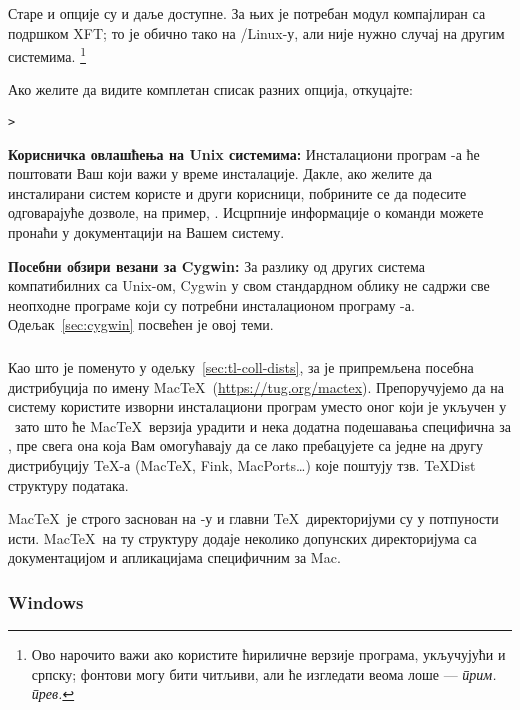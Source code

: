 \documentclass{article}
\begin{document}
Старе  и  опције су и даље доступне.
За њих је потребан модул  компајлиран са подршком 
XFT; то је обично тако на \GNU/Linux-у, али није нужно случај на
другим системима.%
\footnote{\textserbian{Ово нарочито важи ако користите
ћириличне верзије програма, укључујући и српску; фонтови могу бити
читљиви, али ће изгледати веома лоше --- \emph{прим. прев.}}} 

Ако желите да видите комплетан списак разних опција, откуцајте:
\begin{alltt}> 
\end{alltt}

\textbf{Корисничка овлашћења на Unix системима:}
Инсталациони програм \TL{}-а ће поштовати Ваш  који важи
у време инсталације. Дакле, ако желите да инсталирани систем користе
и други корисници, побрините се да подесите одговарајуће дозволе, на
пример, . Исцрпније информације о команди
 можете пронаћи у документацији на Вашем систему.

\textbf{Посебни обзири везани за Cygwin:} За разлику од других
система компатибилних са Unix-ом, Cygwin у свом стандардном облику не
садржи све неопходне програме који су потребни инсталационом програму
\TL{}-а. Одељак~\ref{sec:cygwin} посвећен је овој теми.


\subsubsection{\MacOSX}
\label{sec:macosx}

Као што је поменуто у одељку~\ref{sec:tl-coll-dists}, за \MacOSX је
припремљена посебна дистрибуција по имену Mac\TeX\
(\url{https://tug.org/mactex}). Препоручујемо да на \MacOSX систему
користите изворни инсталациони програм уместо оног који је укључен у
\TL\ зато што ће Mac\TeX\ верзија урадити и нека додатна подешавања
специфична за \MacOSX, пре свега она која Вам омогућавају да се лако
пребацујете са једне на другу дистрибуцију \TeX-а (Mac\TeX, Fink,
MacPorts\ldots{}) које поштују тзв. \TeX{}Dist структуру података.

Mac\TeX\ је строго заснован на \TL-у и главни \TeX\ директоријуми су
у потпуности исти. Mac\TeX\ на ту структуру додаје неколико допунских
директоријума са документацијом и апликацијама специфичним за Mac.


\subsubsection{Windows}\label{sec:wininst}
\end{document}
